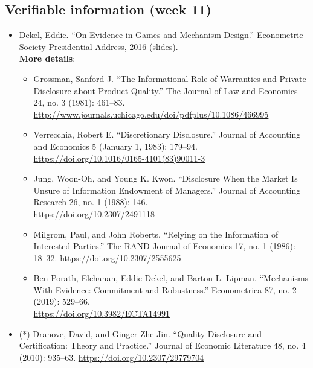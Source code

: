 \documentclass{article}
\begin{document}
\subsection{Verifiable information (week 11)}
\begin{itemize}
	\item Dekel, Eddie. ``On Evidence in Games and Mechanism Design.'' Econometric Society Presidential Address, 2016 (slides).
	\\ \textbf{More details}:
	\begin{itemize}
		\item Grossman, Sanford J. “The Informational Role of Warranties and Private Disclosure about Product Quality.” The Journal of Law and Economics 24, no. 3 (1981): 461–83. \\ \url{http://www.journals.uchicago.edu/doi/pdfplus/10.1086/466995}
		
		\item Verrecchia, Robert E. “Discretionary Disclosure.” Journal of Accounting and Economics 5 (January 1, 1983): 179–94. \url{https://doi.org/10.1016/0165-4101(83)90011-3}
		
		\item Jung, Woon-Oh, and Young K. Kwon. “Disclosure When the Market Is Unsure of Information Endowment of Managers.” Journal of Accounting Research 26, no. 1 (1988): 146. \\ \url{https://doi.org/10.2307/2491118}
		
		\item Milgrom, Paul, and John Roberts. “Relying on the Information of Interested Parties.” The RAND Journal of Economics 17, no. 1 (1986): 18–32. \url{https://doi.org/10.2307/2555625}
		
		\item Ben-Porath, Elchanan, Eddie Dekel, and Barton L. Lipman. “Mechanisms With Evidence: Commitment and Robustness.” Econometrica 87, no. 2 (2019): 529–66. \\ \url{https://doi.org/10.3982/ECTA14991}
	\end{itemize}
	
	\item (*) Dranove, David, and Ginger Zhe Jin. “Quality Disclosure and Certification: Theory and Practice.” Journal of Economic Literature 48, no. 4 (2010): 935–63. \url{https://doi.org/10.2307/29779704}
\end{itemize}
\end{document}
